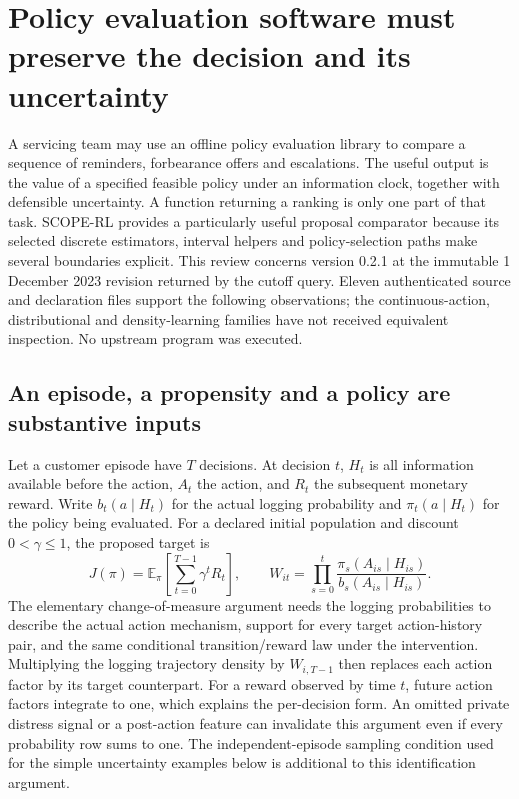 \section{Policy evaluation software must preserve the decision and its uncertainty}
\label{exec23:scope-rl-scope}
A servicing team may use an offline policy evaluation library to compare a
sequence of reminders, forbearance offers and escalations. The useful output is
the value of a specified feasible policy under an information clock, together
with defensible uncertainty. A function returning a ranking is only one part of
that task. SCOPE-RL provides a particularly useful proposal comparator because
its selected discrete estimators, interval helpers and policy-selection paths
make several boundaries explicit. This review concerns version 0.2.1 at the
immutable 1 December 2023 revision returned by the cutoff query. Eleven
authenticated source and declaration files support the following observations;
the continuous-action, distributional and density-learning families have not
received equivalent inspection. No upstream program was executed.
\citep{exec23_scope_rl_sources}

\subsection{An episode, a propensity and a policy are substantive inputs}
\label{exec23:scope-rl-target}
Let a customer episode have $T$ decisions. At decision $t$, $H_t$ is all
information available before the action, $A_t$ the action, and $R_t$ the
subsequent monetary reward. Write $b_t(a\mid H_t)$ for the actual logging
probability and $\pi_t(a\mid H_t)$ for the policy being evaluated. For a declared
initial population and discount $0<\gamma\leq1$, the proposed target is
\[
 J(\pi)=\mathbb E_\pi\!\left[\sum_{t=0}^{T-1}\gamma^tR_t\right],
 \qquad
 W_{it}=\prod_{s=0}^{t}
 \frac{\pi_s(A_{is}\mid H_{is})}{b_s(A_{is}\mid H_{is})}.
\]
The elementary change-of-measure argument needs the logging probabilities to
describe the actual action mechanism, support for every target action-history
pair, and the same conditional transition/reward law under the intervention.
Multiplying the logging trajectory density by $W_{i,T-1}$ then replaces each
action factor by its target counterpart. For a reward observed by time $t$,
future action factors integrate to one, which explains the per-decision form.
An omitted private distress signal or a post-action feature can invalidate this
argument even if every probability row sums to one. The independent-episode
sampling condition used for the simple uncertainty examples below is additional
to this identification argument.

